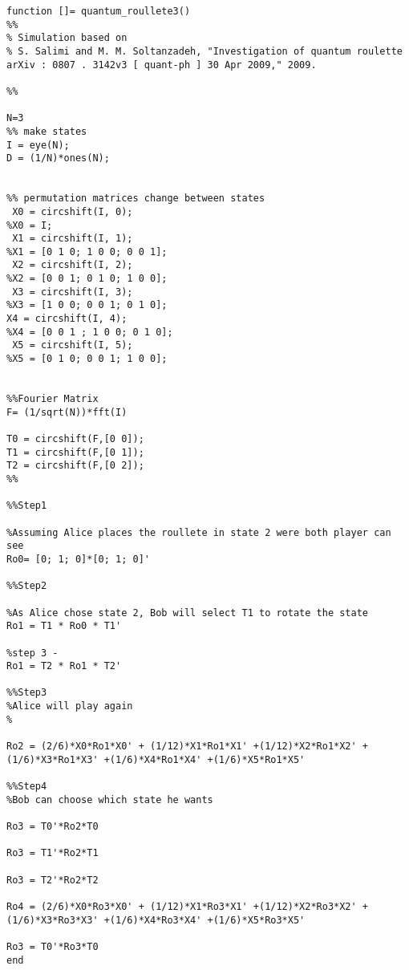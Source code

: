\label{ap:c}


\begin{lstlisting}
function []= quantum_roullete3()
%%
% Simulation based on
% S. Salimi and M. M. Soltanzadeh, "Investigation of quantum roulette arXiv : 0807 . 3142v3 [ quant-ph ] 30 Apr 2009," 2009.

%%

N=3
%% make states
I = eye(N);
D = (1/N)*ones(N);


%% permutation matrices change between states
 X0 = circshift(I, 0);
%X0 = I;
 X1 = circshift(I, 1);
%X1 = [0 1 0; 1 0 0; 0 0 1];
 X2 = circshift(I, 2);
%X2 = [0 0 1; 0 1 0; 1 0 0];
 X3 = circshift(I, 3);
%X3 = [1 0 0; 0 0 1; 0 1 0];
X4 = circshift(I, 4);
%X4 = [0 0 1 ; 1 0 0; 0 1 0];
 X5 = circshift(I, 5);
%X5 = [0 1 0; 0 0 1; 1 0 0];


%%Fourier Matrix
F= (1/sqrt(N))*fft(I)

T0 = circshift(F,[0 0]);
T1 = circshift(F,[0 1]);
T2 = circshift(F,[0 2]);
%%

%%Step1

%Assuming Alice places the roullete in state 2 were both player can see
Ro0= [0; 1; 0]*[0; 1; 0]'

%%Step2

%As Alice chose state 2, Bob will select T1 to rotate the state
Ro1 = T1 * Ro0 * T1'

%step 3 -
Ro1 = T2 * Ro1 * T2'

%%Step3
%Alice will play again 
%

Ro2 = (2/6)*X0*Ro1*X0' + (1/12)*X1*Ro1*X1' +(1/12)*X2*Ro1*X2' +(1/6)*X3*Ro1*X3' +(1/6)*X4*Ro1*X4' +(1/6)*X5*Ro1*X5'

%%Step4
%Bob can choose which state he wants

Ro3 = T0'*Ro2*T0

Ro3 = T1'*Ro2*T1

Ro3 = T2'*Ro2*T2

Ro4 = (2/6)*X0*Ro3*X0' + (1/12)*X1*Ro3*X1' +(1/12)*X2*Ro3*X2' +(1/6)*X3*Ro3*X3' +(1/6)*X4*Ro3*X4' +(1/6)*X5*Ro3*X5'

Ro3 = T0'*Ro3*T0
end
\end{lstlisting}